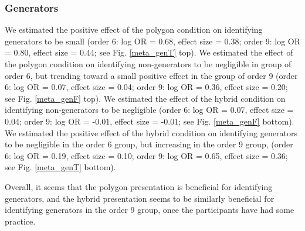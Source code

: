 \documentclass[man,10pt]{apa6}
\begin{document}
\subsubsection{Generators} We estimated the positive effect of the polygon condition on identifying generators to be small (order 6: log OR = 0.68, effect size = 0.38; order 9: log OR = 0.80, effect size = 0.44; see Fig. \ref{meta_genT} top). We estimated the effect of the polygon condition on identifying non-generators to be negligible in group of order 6, but trending toward a small positive effect in the group of order 9 (order 6: log OR = 0.07, effect size = 0.04; order 9: log OR = 0.36, effect size = 0.20; see Fig. \ref{meta_genF} top). We estimated the effect of the hybrid condition on identifying non-generators to be negligible (order 6: log OR = 0.07, effect size = 0.04; order 9: log OR = -0.01, effect size = -0.01; see Fig. \ref{meta_genF} bottom). We estimated the positive effect of the hybrid condition on identifying generators to be negligible in the order 6 group, but increasing in the order 9 group, (order 6: log OR = 0.19, effect size = 0.10; order 9: log OR = 0.65, effect size = 0.36; see Fig. \ref{meta_genT} bottom). \par
Overall, it seems that the polygon presentation is beneficial for identifying generators, and the hybrid presentation seems to be similarly beneficial for identifying generators in the order 9 group, once the participants have had some practice. 
\end{document}
